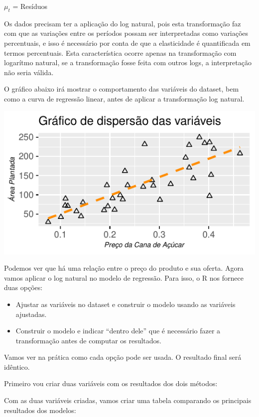 \documentclass[
  12pt,
  a4paper,
]{article}
\begin{document}
\(\mu_t\) = Resíduos

Os dados precisam ter a aplicação do log natural, pois esta transformação faz com que as variações entre os períodos possam ser interpretadas como variações percentuais, e isso é necessário por conta de que a elasticidade é quantificada em termos percentuais. Esta característica ocorre apenas na transformação com logarítmo natural, se a transformação fosse feita com outros logs, a interpretação não seria válida.

O gráfico abaixo irá mostrar o comportamento das variáveis do dataset, bem como a curva de regressão linear, antes de aplicar a transformação log natural.

\begin{center}\includegraphics{article_files/figure-latex/unnamed-chunk-6-1} \end{center}

Podemos ver que há uma relação entre o preço do produto e sua oferta. Agora vamos aplicar o log natural no modelo de regressão. Para isso, o R nos fornece duas opções:

\begin{itemize}
\item
  Ajustar as variáveis no dataset e construir o modelo usando as variáveis ajustadas.
\item
  Construir o modelo e indicar ``dentro dele'' que é necessário fazer a transformação antes de computar os resultados.
\end{itemize}

Vamos ver na prática como cada opção pode ser usada. O resultado final será idêntico.

Primeiro vou criar duas variáveis com os resultados dos dois métodos:

Com as duas variáveis criadas, vamos criar uma tabela comparando os principais resultados dos modelos:
\end{document}
